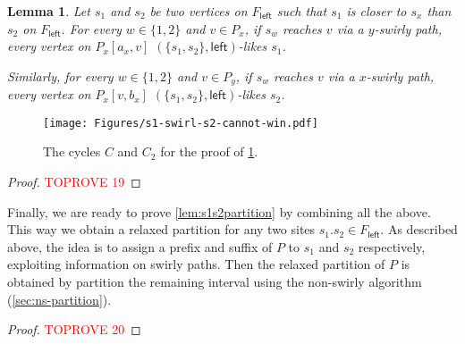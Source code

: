 \documentclass{article}
\newcommand{\leftside}{\mathsf{left}}
\newtheorem{lemma}{Lemma}
\begin{document}
\begin{lemma}\label{lem:s1-swirl-s2-cannot-win}
Let $s_1$ and $s_2$ be two vertices on $F_{\leftside}$ such that $s_1$ is closer to $s_x$ than $s_2$ on $F_{\leftside}$.
For every $w\in \{1,2\}$ and $v\in P_x$, if $s_w$ reaches $v$ via a $y$-swirly path, every vertex on $P_x[a_x,v]$ $(\{s_1,s_2\},\leftside)$-likes $s_1$.

Similarly, for every $w\in \{1,2\}$ and $v\in P_y$, if $s_w$ reaches $v$ via a $x$-swirly path, every vertex on $P_x[v,b_x]$ $(\{s_1,s_2\},\leftside)$-likes $s_2$.

\end{lemma}
\begin{figure}[ht!]
    \centering
    \texttt{[image: Figures/s1-swirl-s2-cannot-win.pdf]}
    \caption{The cycles $C$ and $C_2$ for the proof of \cref{lem:s1-swirl-s2-cannot-win}.}
    \label{fig:s1-swirl-s2-cannot-win}
\end{figure}
\begin{proof}\textcolor{red}{TOPROVE 19}\end{proof}




Finally, we are ready to prove \cref{lem:s1s2partition} by combining all the above.
This way we obtain a relaxed partition for any two sites $s_1.s_2\in F_{\leftside}$.
As described above, the idea is to assign a prefix and suffix of $P$ to $s_1$ and $s_2$ respectively, exploiting information on swirly paths.
Then the relaxed partition of $P$ is obtained by partition the remaining interval using the non-swirly algorithm (\cref{sec:ns-partition}).

\lemtwositespartition*
\begin{proof}\textcolor{red}{TOPROVE 20}\end{proof}
\end{document}
